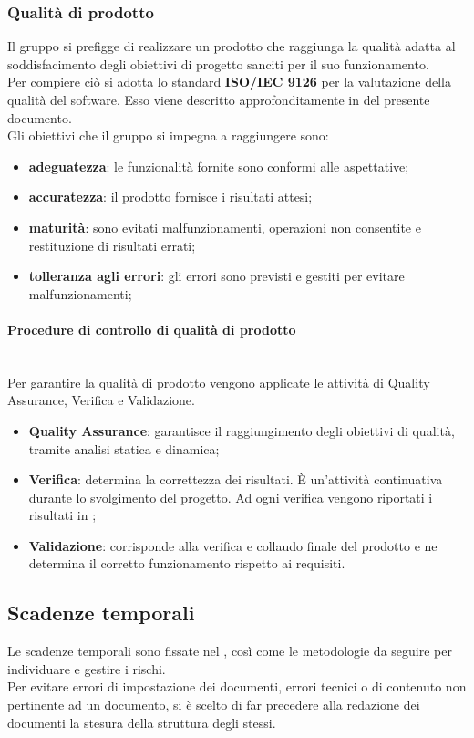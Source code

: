 \subsubsection{Qualità di prodotto}
Il gruppo si prefigge di realizzare un prodotto che raggiunga la qualità adatta al soddisfacimento degli obiettivi di progetto sanciti per il suo funzionamento.\\
Per compiere ciò si adotta lo standard \textbf{ISO/IEC 9126} per la valutazione della qualità del software. Esso viene descritto approfonditamente in  del presente documento.\\
Gli obiettivi che il gruppo si impegna a raggiungere sono:
\begin{itemize}
	\item \textbf{adeguatezza}: le funzionalità fornite sono conformi alle aspettative;
	\item \textbf{accuratezza}: il prodotto fornisce i risultati attesi;
	\item \textbf{maturità}: sono evitati malfunzionamenti, operazioni non consentite e restituzione di risultati errati;
	\item \textbf{tolleranza agli errori}: gli errori sono previsti e gestiti per evitare malfunzionamenti;
\end{itemize}


\paragraph{Procedure di controllo di qualità di prodotto}\mbox{}\\
Per garantire la qualità di prodotto vengono applicate le attività di Quality Assurance, Verifica e Validazione.
\begin{itemize}
	\item \textbf{Quality Assurance}: garantisce il raggiungimento degli obiettivi di qualità, tramite analisi statica e dinamica;
	\item \textbf{Verifica}: determina la correttezza dei risultati. \`{E} un’attività continuativa durante lo svolgimento del progetto. Ad ogni verifica vengono riportati i risultati in ;
	\item \textbf{Validazione}: corrisponde alla verifica e collaudo finale del prodotto e ne determina il corretto funzionamento rispetto ai requisiti.
\end{itemize}

\subsection{Scadenze temporali}
Le scadenze temporali sono fissate nel \PianoDiProgetto{}, così come le metodologie da seguire per individuare e gestire i rischi.\\
Per evitare errori di impostazione dei documenti, errori tecnici o di contenuto non pertinente ad un documento, si è scelto di far precedere alla redazione dei documenti la stesura della struttura degli stessi.
